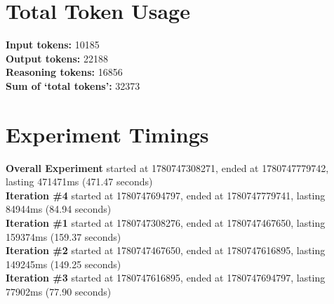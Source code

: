 \documentclass{article}
\begin{document}
\section*{Total Token Usage}
\textbf{Input tokens: }10185
\\\textbf{Output tokens: }22188
\\\textbf{Reasoning tokens: }16856
\\\textbf{Sum of `total tokens': }32373
\section*{Experiment Timings}
\textbf{Overall Experiment} started at 1780747308271, ended at 1780747779742, lasting 471471ms (471.47 seconds)
\\\textbf{Iteration \#4} started at 1780747694797, ended at 1780747779741, lasting 84944ms (84.94 seconds)
\\\textbf{Iteration \#1} started at 1780747308276, ended at 1780747467650, lasting 159374ms (159.37 seconds)
\\\textbf{Iteration \#2} started at 1780747467650, ended at 1780747616895, lasting 149245ms (149.25 seconds)
\\\textbf{Iteration \#3} started at 1780747616895, ended at 1780747694797, lasting 77902ms (77.90 seconds)
\end{document}
